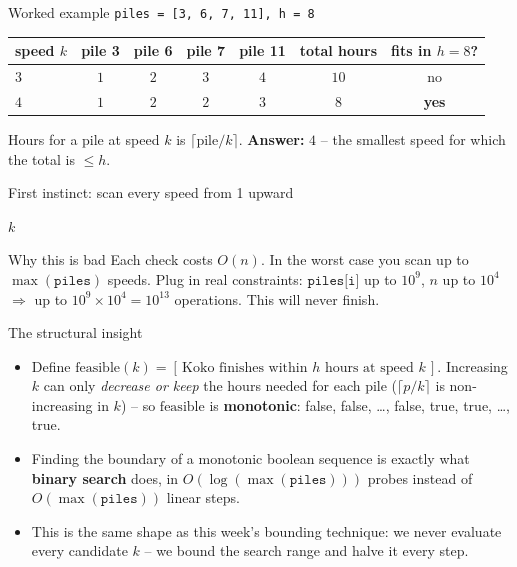 \documentclass[11pt,aspectratio=169]{beamer}
\begin{document}
\begin{frame}{Worked example}
  \texttt{piles = [3, 6, 7, 11], h = 8}
  \begin{center}
  \begin{tabular}{@{}lcccccc@{}}
    \toprule
    speed $k$ & pile 3 & pile 6 & pile 7 & pile 11 & total hours & fits in $h{=}8$? \\
    \midrule
    $3$ & $1$ & $2$ & $3$ & $4$ & $10$ & no \\
    $4$ & $1$ & $2$ & $2$ & $3$ & $8$ & \textbf{yes} \\
    \bottomrule
  \end{tabular}
  \end{center}
  Hours for a pile at speed $k$ is $\lceil \text{pile}/k \rceil$. \textbf{Answer:} $4$ --
  the smallest speed for which the total is $\le h$.
\end{frame}

\begin{frame}{First instinct: scan every speed from 1 upward}
  \begin{algorithmic}[1]
        \State \Return $k$
      \EndIf
    \EndFor
  \end{algorithmic}
  \begin{alertblock}{Why this is bad}
    Each check costs $O(n)$. In the worst case you scan up to $\max(\texttt{piles})$
    speeds. Plug in real constraints: $\texttt{piles[i]}$ up to $10^9$, $n$ up to $10^4$
    $\Rightarrow$ up to $10^9 \times 10^4 = 10^{13}$ operations. This will never finish.
  \end{alertblock}
\end{frame}

\begin{frame}{The structural insight}
  \begin{itemize}
    \item Define $\mathrm{feasible}(k) = [\,\text{Koko finishes within } h \text{ hours
    at speed } k\,]$. Increasing $k$ can only \emph{decrease or keep} the hours needed
    for each pile ($\lceil p/k\rceil$ is non-increasing in $k$) -- so
    $\mathrm{feasible}$ is \textbf{monotonic}: false, false, \dots, false, true, true,
    \dots, true.
    \item Finding the boundary of a monotonic boolean sequence is exactly what
    \textbf{binary search} does, in $O(\log(\max(\texttt{piles})))$ probes instead of
    $O(\max(\texttt{piles}))$ linear steps.
    \item This is the same shape as this week's bounding technique: we never evaluate
    every candidate $k$ -- we bound the search range and halve it every step.
  \end{itemize}
\end{frame}
\end{document}
